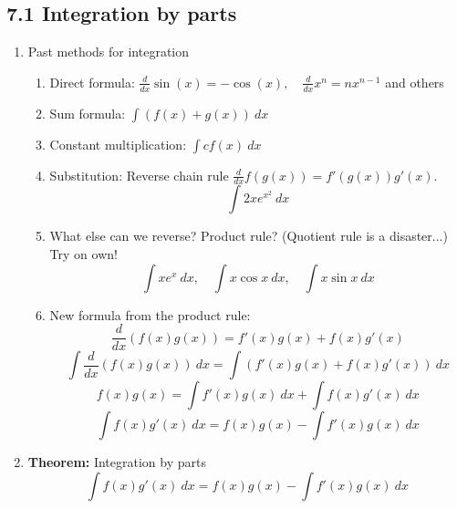 \documentclass{article}
\newcommand{\ds}{\displaystyle}
\begin{document}
\subsection{7.1 Integration by parts}
\begin{enumerate}

\item Past methods for integration
\begin{enumerate}
\item Direct formula: $\ds \frac{d}{dx} \sin(x) = -\cos(x), \quad \frac{d}{dx} x^n = nx^{n-1}$ and others
\item Sum formula: $\ds \int (f(x) + g(x))~dx$ 
\item Constant multiplication: $\ds \int cf(x)~dx$
\item Substitution: Reverse chain rule $\ds \frac{d}{dx} f(g(x)) = f'(g(x))g'(x)$.
$$
\int 2xe^{x^2}~dx
$$
\item What else can we reverse? Product rule? (Quotient rule is a disaster...) Try on own!
$$
\int xe^x~dx,\quad\int x\cos x~dx,\quad \int x\sin x~dx
$$
\item New formula from the product rule:
\[
\frac{d}{dx} (f(x)g(x)) = f'(x)g(x) + f(x)g'(x) 
\]
\[
\int \frac{d}{dx} (f(x)g(x)) ~dx = \int \left(f'(x)g(x) + f(x)g'(x)\right) ~dx 
\]
\[
f(x)g(x)= \int f'(x)g(x) ~dx + \int f(x)g'(x) ~dx 
\]
\[
\int f(x)g'(x) ~dx = f(x)g(x) - \int f'(x)g(x) ~dx 
\]
\end{enumerate}


\item {\bf Theorem:} Integration by parts
\[
\int f(x)g'(x) ~dx = f(x)g(x) - \int f'(x)g(x) ~dx 
\]


\end{enumerate}
\end{document}
